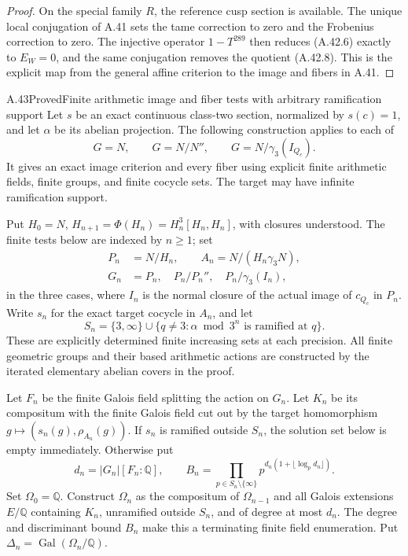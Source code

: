 \begin{proof}
On the special family $R$, the reference cusp section is
available. The unique local conjugation of A.41 sets the
tame correction to zero and the Frobenius correction to
zero. The injective operator $1-T^{289}$ then reduces
(A.42.6) exactly to $E_W=0$, and the same conjugation
removes the quotient (A.42.8). This is the explicit map
from the general affine criterion to the image and fibers
in A.41.
\end{proof}

\begin{statement}{A.43}{Proved}{Finite arithmetic image and fiber tests with arbitrary ramification support}
Let $s$ be an exact continuous class-two section, normalized
by $s(c)=1$, and let $\alpha$ be its abelian projection.
The following construction applies to each of
\[
       G=N,\qquad G=N/N'',\qquad G=N/\gamma_3(I_{Q_c}).
 \tag{A.43.1}
\]
It gives an exact image criterion and every fiber using
explicit finite arithmetic fields, finite groups, and finite
cocycle sets. The target may have infinite ramification
support.

Put $H_0=N$, $H_{n+1}=\Phi(H_n)=H_n^3[H_n,H_n]$, with
closures understood. The finite tests below are indexed by
$n\ge1$; set
\[
\begin{split}
 P_n&=N/H_n,\qquad A_n=N/(H_n\gamma_3N),\\
 G_n&=P_n,\quad P_n/P_n'',\quad
                 P_n/\gamma_3(I_n),
\end{split}
 \tag{A.43.2}
\]
in the three cases, where $I_n$ is the normal closure of
the actual image of $c_{Q_c}$ in $P_n$. Write $s_n$ for the
exact target cocycle in $A_n$, and let
\[
 S_n=\{3,\infty\}\cup
       \{q\ne3:\alpha\bmod3^n\text{ is ramified at }q\}.
 \tag{A.43.3}
\]
These are explicitly determined finite increasing sets at
each precision. All finite geometric groups and their based
arithmetic actions are constructed by the iterated elementary
abelian covers in the proof.

Let $F_n$ be the finite Galois field splitting the action on
$G_n$. Let $K_n$ be its compositum with the finite Galois
field cut out by the target homomorphism
$g\mapsto(s_n(g),\rho_{A_n}(g))$. If $s_n$ is ramified
outside $S_n$, the solution set below is empty immediately.
Otherwise put
\[
 d_n=|G_n|[F_n:\mathbb Q],\qquad
 B_n=\prod_{p\in S_n\setminus\{\infty\}}
               p^{d_n(1+\lfloor\log_p d_n\rfloor)}.
 \tag{A.43.4}
\]
Set $\Omega_0=\mathbb Q$. Construct $\Omega_n$ as the compositum of $\Omega_{n-1}$
and all Galois extensions $E/\mathbb Q$ containing $K_n$,
unramified outside $S_n$, and of degree at most $d_n$.
The degree and discriminant bound $B_n$ make this a
terminating finite field enumeration. Put
$\Delta_n=\operatorname{Gal}(\Omega_n/\mathbb Q)$.


\end{statement}
